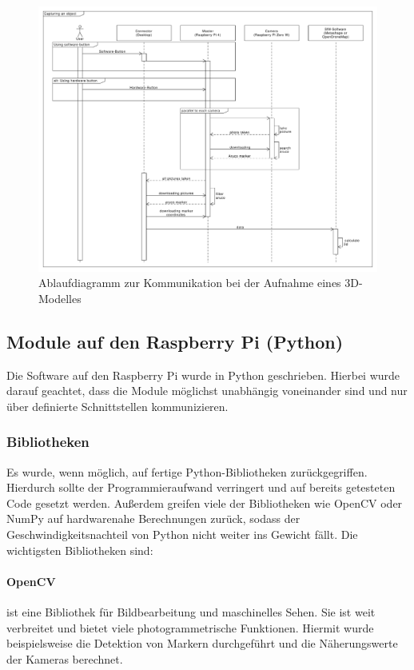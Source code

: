 \documentclass[./00PhotoBox.tex]{subfiles}
\begin{document}
\begin{figure}
  \centering
  \includegraphics[width=1\textwidth]{./img/uml/uml_sequence_capture.pdf}
  \caption{Ablaufdiagramm zur Kommunikation bei der Aufnahme eines 3D-Modelles} %
  \label{img:uml_sequence_capture} %
\end{figure}


\subsection{Module auf den Raspberry Pi (Python)}
Die Software auf den Raspberry Pi wurde in Python geschrieben. Hierbei wurde darauf geachtet, dass die Module möglichst unabhängig voneinander sind und nur über definierte Schnittstellen kommunizieren.

\subsubsection{Bibliotheken}
Es wurde, wenn möglich, auf fertige Python-Bibliotheken zurückgegriffen. Hierdurch sollte der Programmieraufwand verringert und auf bereits getesteten Code gesetzt werden. Außerdem greifen viele der Bibliotheken wie OpenCV oder NumPy auf hardwarenahe Berechnungen zurück, sodass der Geschwindigkeitsnachteil von Python nicht weiter ins Gewicht fällt. Die wichtigsten Bibliotheken sind:

\paragraph{OpenCV}
ist eine Bibliothek für Bildbearbeitung und maschinelles Sehen. Sie ist weit verbreitet und bietet viele photogrammetrische Funktionen. Hiermit wurde beispielsweise die Detektion von Markern durchgeführt und die Näherungswerte der Kameras berechnet.
\end{document}
